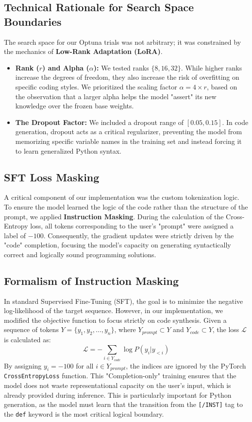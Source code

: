 \subsection{Technical Rationale for Search Space Boundaries}
The search space for our Optuna trials was not arbitrary; it was constrained by the mechanics of \textbf{Low-Rank Adaptation (LoRA)}.
\begin{itemize}
\item \textbf{Rank ($r$) and Alpha ($\alpha$):} We tested ranks $\{8, 16, 32\}$. While higher ranks increase the degrees of freedom, they also increase the risk of overfitting on specific coding styles. We prioritized the scaling factor $\alpha = 4 \times r$, based on the observation that a larger alpha helps the model "assert" its new knowledge over the frozen base weights.
\item \textbf{The Dropout Factor:} We included a dropout range of $[0.05, 0.15]$. In code generation, dropout acts as a critical regularizer, preventing the model from memorizing specific variable names in the training set and instead forcing it to learn generalized Python syntax.
\end{itemize}



\subsection{SFT Loss Masking}
A critical component of our implementation was the custom tokenization logic. To ensure the model learned the logic of the code rather than the structure of the prompt, we applied \textbf{Instruction Masking}. During the calculation of the Cross-Entropy loss, all tokens corresponding to the user's "prompt" were assigned a label of $-100$. Consequently, the gradient updates were strictly driven by the "code" completion, focusing the model's capacity on generating syntactically correct and logically sound programming solutions.

\subsection{Formalism of Instruction Masking}In standard Supervised Fine-Tuning (SFT), the goal is to minimize the negative log-likelihood of the target sequence. However, in our implementation, we modified the objective function to focus strictly on code synthesis. Given a sequence of tokens $Y = \{y_1, y_2, \dots, y_n\}$, where $Y_{prompt} \subset Y$ and $Y_{code} \subset Y$, the loss $\mathcal{L}$ is calculated as:\begin{equation}\mathcal{L} = -\sum_{i \in Y_{code}} \log P(y_i | y_{<i})\end{equation}By assigning $y_i = -100$ for all $i \in Y_{prompt}$, the indices are ignored by the PyTorch \texttt{CrossEntropyLoss} function. This "Completion-only" training ensures that the model does not waste representational capacity on the user's input, which is already provided during inference. This is particularly important for Python generation, as the model must learn that the transition from the \texttt{[/INST]} tag to the \texttt{def} keyword is the most critical logical boundary.


